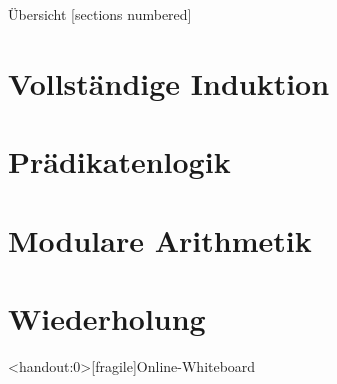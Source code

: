 %
%
%
%



\renewcommand\daynr{3}




\maketitle

\begin{frame}[fragile]{Übersicht}
	[sections numbered]
	\tableofcontents%
\end{frame}

\section{Vollständige Induktion}







\section{Prädikatenlogik}




\section{Modulare Arithmetik}


\section{Wiederholung}








\appendix

\begin{frame}<handout:0>[fragile]{Online-Whiteboard}
	\phantom{text}
\end{frame}


